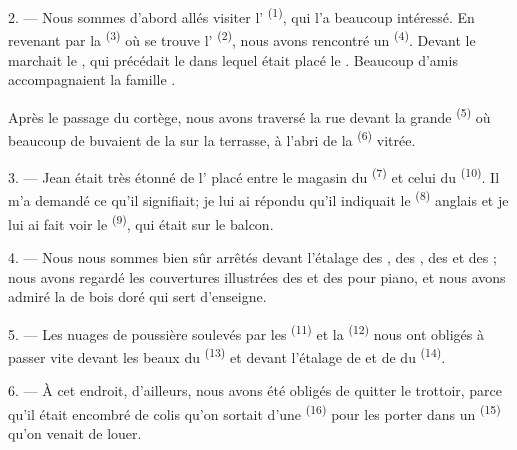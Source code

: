 2. --- Nous sommes d'abord allés visiter l'
\textsuperscript{(1)}, qui l'a beaucoup intéressé. En revenant par la
 \textsuperscript{(3)} où se trouve l' \textsuperscript{(2)}, nous avons rencontré un 
\textsuperscript{(4)}. Devant le  marchait le
, qui précédait le  dans lequel était placé
le . Beaucoup d'amis accompagnaient la famille
.

Après le passage du cortège, nous avons traversé la rue devant la grande
 \textsuperscript{(5)} où beaucoup de 
buvaient de la  sur la terrasse, à l'abri de la 
\textsuperscript{(6)} vitrée.

3. --- Jean était très étonné de l' placé entre le magasin du
 \textsuperscript{(7)} et celui du
 \textsuperscript{(10)}. Il m'a demandé ce qu'il
signifiait; je lui ai répondu qu'il indiquait le 
\textsuperscript{(8)} anglais et je lui ai fait voir le 
\textsuperscript{(9)}, qui était sur le balcon.

\VUsaut{3.0mm}

4. --- Nous nous sommes bien sûr arrêtés devant l'étalage des , des , des  et des
; nous avons regardé les couvertures illustrées des
 et des  pour piano, et nous avons admiré la
 de bois doré qui sert d'enseigne.

5. --- Les nuages de poussière soulevés par les 
\textsuperscript{(11)} et la  \textsuperscript{(12)}
nous ont obligés à passer vite devant les beaux  du
 \textsuperscript{(13)} et devant l'étalage de
 et de  du 
\textsuperscript{(14)}.

6. --- À cet endroit, d'ailleurs, nous avons été obligés de quitter le trottoir,
parce qu'il était encombré de colis qu'on sortait d'une  \textsuperscript{(16)} pour les porter dans un 
\textsuperscript{(15)} qu'on venait de louer.

